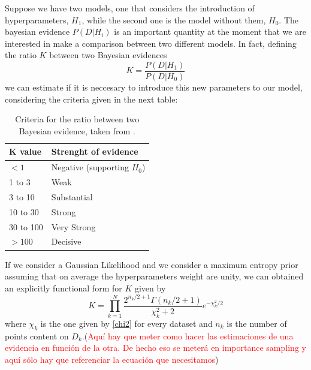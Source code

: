\documentclass[onecolumn,           %
               showpacs,            %
               preprintnumbers,     %
               aps,                 %
               prl,          	    %
               letterpaper,             %
               superscriptaddress,      %
               nofootinbib,         %
               tightenlines,        %
               floats,floatfix      %
               ,usenatbib,
               ]{revtex4-1}
\begin{document}
Suppose we have two models, one that considers the introduction of hyperparameters, $H_1$, while the second one is the model without them, $H_0$. The bayesian evidence $P(D|H_i)$ is an important quantity at the moment that we are interested in make a comparison between two different models. In fact, defining the ratio $K$ between two Bayesian evidences
\begin{equation}
K=\frac{P(D|H_1)}{P(D|H_0)}
\end{equation}
we can estimate if it is neccesary to introduce this new parameters to our model, considering the criteria given in the next table:
\begin{table}[h!]
\centering
\begin{tabular}{||l|l||} 
 \hline
 \textbf{K value} & \textbf{Strenght of evidence} \\ [0.5ex] 
 \hline\hline
 $<1$  & Negative (supporting $H_0$)   \\ 
 \hline
 1 to 3 & Weak \\
 \hline 
3 to 10 & Substantial\\
\hline
10 to 30 & Strong\\
\hline
30 to 100 & Very Strong \\
\hline
$>100$ & Decisive\\ [1ex] 
 \hline
\end{tabular}\label{evidence}
\caption{Criteria for the ratio between two Bayesian evidence, taken from \cite{hiperp2}.}
\end{table}

If we consider a Gaussian Likelihood and we consider a maximum entropy prior assuming that on average the hyperparameters weight are unity, we can obtained an explicitly functional form for $K$ given by
\begin{equation}
K=\prod_{k=1}^N\frac{2^{n_k/2+1}\Gamma(n_k/2+1)}{\chi^2_k+2}e^{-\chi_k^2/2}
\end{equation}
where $\chi_k$ is the one given by \ref{chi2} for every dataset and $n_k$ is the number of points content on $D_k$.(\textcolor{red}{Aqu\'i hay que meter como hacer las estimaciones de una evidencia en funci\'on de la otra. De hecho eso se meter\'a en importance sampling y aqu\'i s\'olo hay que referenciar la ecuaci\'on que necesitamos})


\end{document}

